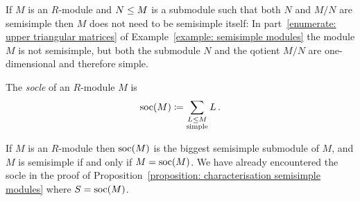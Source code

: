 \begin{warning}
  If $M$ is an $R$-module and $N \leq M$ is a submodule such that both $N$ and $M/N$ are semisimple then $M$ does not need to be semisimple itself:
  In part~\ref*{enumerate: upper triangular matrices} of Example~\ref{example: semisimple modules} the module $M$ is not semisimple, but both the submodule $N$ and the qotient $M/N$ are one-dimensional and therefore simple.
\end{warning}



\begin{definition}
  The \emph{socle} of an $R$-module $M$ is
  \[
              \operatorname{soc}(M)
    \coloneqq  \sum_{\substack{L \leq M \\ \text{simple}}} L \,.
  \]
\end{definition}


\begin{remark}
  If $M$ is an $R$-module then $\operatorname{soc}(M)$ is the biggest semisimple submodule of $M$, and $M$ is semisimple if and only if $M = \operatorname{soc}(M)$.
  We have already encountered the socle in the proof of Proposition~\ref{proposition: characterisation semisimple modules} where $S = \operatorname{soc}(M)$.
\end{remark}




